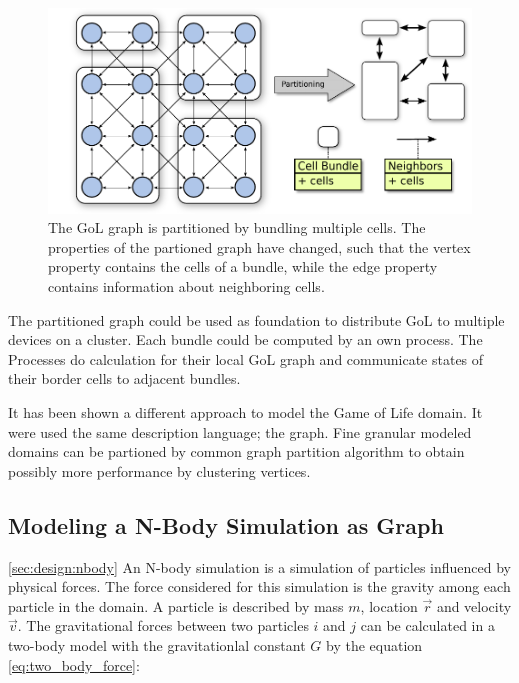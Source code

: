 \begin{figure}[H]
  \centering \includegraphics[width=\textwidth]{graphics/30_gol_bundle}
  \caption{The GoL graph is partitioned by bundling multiple
    cells. The properties of the partioned graph have changed, such
    that the vertex property contains the cells of a bundle, while the
    edge property contains information about neighboring cells.}
  \label{fig:gol_bundle}
\end{figure}

The partitioned graph could be used as foundation to distribute GoL to
multiple devices on a cluster. Each bundle could be computed by an own
process. The Processes do calculation for their local GoL graph and
communicate states of their border cells to adjacent bundles.

It has been shown a different approach to model the Game of Life
domain. It were used the same description language; the graph.
Fine granular modeled domains can be partioned by common graph
partition algorithm to obtain possibly more performance by
clustering vertices.


\subsection{Modeling a N-Body Simulation as Graph}
\ref{sec:design:nbody}
An N-body simulation is a simulation of particles influenced by
physical forces. The force considered for this simulation is the
gravity among each particle in the domain.  A particle is described by
mass $m$, location $\overrightarrow{r}$ and velocity $\overrightarrow{v}$.  The gravitational forces
between two particles $i$ and $j$ can be calculated in a two-body model 
with the gravitationlal constant $G$ by the equation \ref{eq:two_body_force}:

